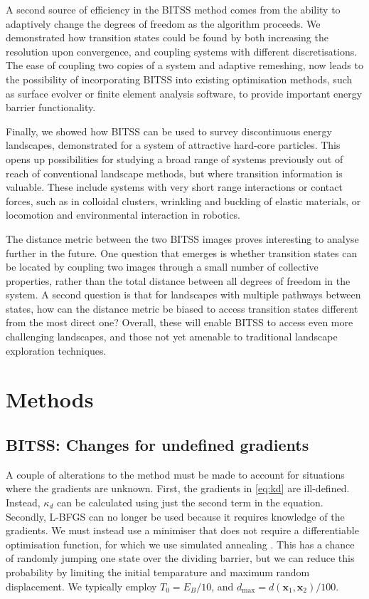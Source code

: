 \documentclass[twocolumn,10pt]{revtex4-2}
\begin{document}
A second source of efficiency in the BITSS method comes from the ability to adaptively change the degrees of freedom as the algorithm proceeds.
We demonstrated how transition states could be found by both increasing the resolution upon convergence, and coupling systems with different discretisations.
The ease of coupling two copies of a system and adaptive remeshing, now leads to the possibility of incorporating BITSS into existing optimisation methods, such as surface evolver or finite element analysis software, to provide important energy barrier functionality. 

Finally, we showed how BITSS can be used to survey discontinuous energy landscapes, demonstrated for a system of attractive hard-core particles.
This opens up possibilities for studying a broad range of systems previously out of reach of conventional landscape methods, but where transition information is valuable.
These include systems with very short range interactions or contact forces, such as in colloidal clusters, wrinkling and buckling of elastic materials, or locomotion and environmental interaction in robotics.

The distance metric between the two BITSS images proves interesting to analyse further in the future.
One question that emerges is whether transition states can be located by coupling two images through a small number of collective properties, rather than the total distance between all degrees of freedom in the system.
A second question is that for landscapes with multiple pathways between states, how can the distance metric be biased to access transition states different from the most direct one? Overall, these will enable BITSS to access even more challenging landscapes, and those not yet amenable to traditional landscape exploration techniques.


\section{Methods}

\subsection{BITSS: Changes for undefined gradients}
A couple of alterations to the method must be made to account for situations where the gradients are unknown.
First, the gradients in \cref{eq:kd} are ill-defined.
Instead, $\kappa_d$ can be calculated using just the second term in the equation.
Secondly, L-BFGS can no longer be used because it requires knowledge of the gradients.
We must instead use a minimiser that does not require a differentiable optimisation function, for which we use simulated annealing \cite{Kirkpatrick1983}.
This has a chance of randomly jumping one state over the dividing barrier, but we can reduce this probability by limiting the initial temparature and maximum random displacement.
We typically employ $T_0 = E_B / 10$, and $d_\text{max} = d(\bm{x}_1, \bm{x}_2) / 100$.
\end{document}

